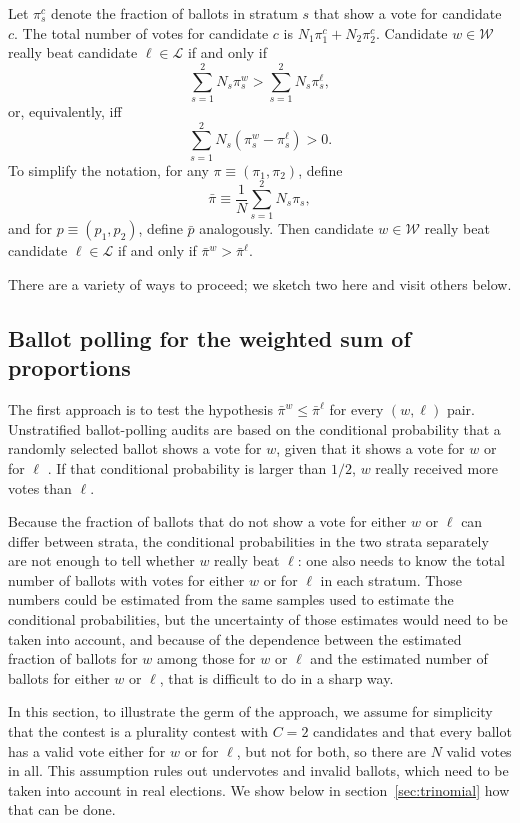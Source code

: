 \documentclass[12pt]{article}
\newcommand{\beq}{\begin{equation}}
\newcommand{\eeq}{\end{equation}}
\newcommand{\mc}[1]{\ensuremath{\mathcal{#1}}}
\newcommand{\bpi}{\bar{\pi}}
\newcommand{\bp}{\bar{p}}
\begin{document}
Let $\pi_s^c$ denote the fraction of ballots in stratum $s$ that show a vote for candidate $c$.
The total number of votes for candidate $c$ is $N_1 \pi_1^c + N_2 \pi_2^c$.
Candidate $w \in \mc{W}$ really beat candidate $\ell \in \mc{L}$ if and only if
\beq
    \sum_{s=1}^2 N_s \pi_s^w > \sum_{s=1}^2 N_s \pi_s^\ell,
\eeq
or, equivalently, iff
\beq
    \sum_{s=1}^2 N_s (\pi_s^w-\pi_s^\ell) > 0.
\eeq
To simplify the notation, for any $\pi \equiv (\pi_1, \pi_2)$, define 
\beq
    \bpi \equiv \frac{1}{N}\sum_{s=1}^2 N_s \pi_s,
\eeq
and for $p \equiv (p_1, p_2)$, define $\bp$ analogously.
Then candidate $w \in \mc{W}$ really beat candidate $\ell \in \mc{L}$ if and only if
$\bpi^w > \bpi^\ell$.

There are a variety of ways to proceed; we sketch two here and visit others below.


\subsection{Ballot polling for the weighted sum of proportions}
The first approach is to test the hypothesis 
$\bpi^w \le \bpi^\ell$ for every $(w, \ell)$ pair.
Unstratified ballot-polling audits are based on the conditional 
probability that a randomly selected
ballot shows a vote for $w$, given that it shows a vote for $w$ or for $\ell$
\citep{lindemanStark12,lindemanEtal12}.
If that conditional probability is larger than $1/2$, $w$ really received more votes than
$\ell$.

Because the fraction of ballots that do not show a vote for either $w$ or $\ell$ can differ
between strata, the conditional probabilities in the two strata separately are not enough
to tell whether $w$ really beat $\ell$: one also needs to know the total number of ballots with votes 
for either $w$ or for $\ell$ in each stratum.
Those numbers could be estimated from the same samples used to estimate the conditional 
probabilities, but the uncertainty of those estimates would need to be taken into account, and 
because of the dependence between the estimated fraction of ballots for $w$ among those for $w$ or $\ell$
and the estimated number of ballots for either $w$ or $\ell$, that is difficult to do in a sharp way.

In this section, to illustrate the germ of the approach,
we assume for simplicity that the contest is a plurality contest with $C=2$ candidates and
that every ballot
has a valid vote either for $w$ or for $\ell$, but not for both, so there are $N$ valid votes in all.
This assumption rules out undervotes and invalid ballots, which need to be taken into
account in real elections. 
We show below in section~\ref{sec:trinomial} how that can be done.
\end{document}
